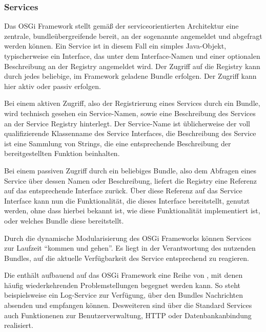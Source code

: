 \subsubsection{Services} %
Das OSGi Framework stellt gemäß der serviceorientierten Architektur eine
zentrale, bundleübergreifende  bereit, an der
sogenannte  angemeldet und abgefragt werden können.
Ein Service ist in diesem Fall ein simples Java-Objekt, typischerweise ein
Interface, das unter dem Interface-Namen und einer optionalen Beschreibung an
der Registry angemeldet wird.
Der Zugriff auf die Registry kann durch jedes beliebige, im
Framework geladene Bundle erfolgen. Der Zugriff kann hier aktiv oder passiv
erfolgen.

Bei einem aktiven Zugriff, also der Registrierung eines Services durch ein
Bundle, wird technisch gesehen ein Service-Namen, sowie eine Beschreibung des
Services an der Service Registry hinterlegt. Der Service-Name ist üblicherweise
der voll qualifizierende Klassenname des Service Interfaces, die Beschreibung
des Service ist eine Sammlung von Strings, die eine entsprechende Beschreibung
der bereitgestellten Funktion beinhalten.

Bei einem passiven Zugriff durch ein beliebiges Bundle, also dem Abfragen eines
Service über dessen Namen oder Beschreibung, liefert die Registry eine
Referenz auf das entsprechende Interface zurück.
Über diese Referenz auf das Service Interface kann nun die Funktionalität, die
dieses Interface bereitstellt, genutzt werden, ohne dass hierbei bekannt ist,
wie diese Funktionalität implementiert ist, oder welches Bundle diese
bereitstellt.

Durch die dynamische Modularisierung des OSGi Frameworks können Services zur
Laufzeit \enquote{kommen und gehen}. Es liegt in der Verantwortung des
nutzenden Bundles, auf die aktuelle Verfügbarkeit des Service entsprechend zu
reagieren.

Die  enthält aufbauend auf das OSGi Framework eine
Reihe von , mit denen häufig wiederkehrenden
Problemstellungen begegnet werden kann. So steht beispielsweise ein Log-Service
zur Verfügung, über den Bundles Nachrichten absenden und empfangen können.
Desweiteren sind über die Standard Services auch Funktionenen zur
Benutzerverwaltung, HTTP oder Datenbankanbindung realisiert.
\citep{wtherich_die_2008}
